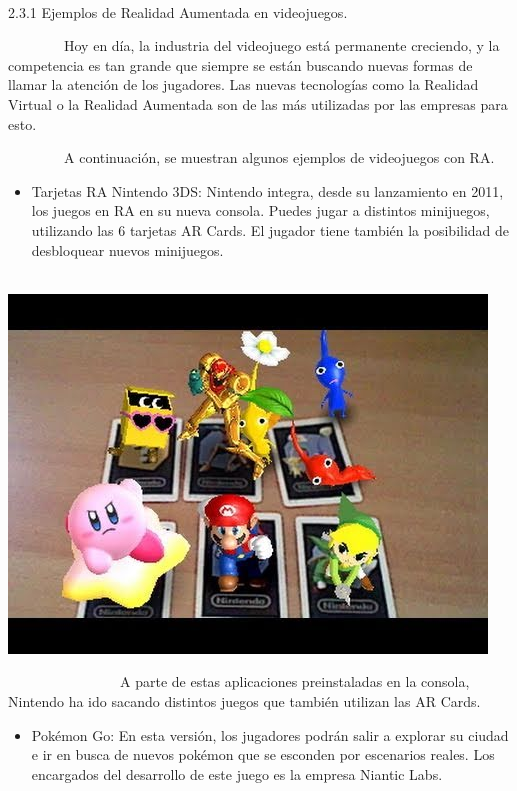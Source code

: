 \documentclass[]{article}
\begin{document}
~~~~~~~~

2.3.1 Ejemplos de Realidad Aumentada en videojuegos.

~~~~~~~~Hoy en día, la industria del videojuego está permanente
creciendo, y la competencia es tan grande que siempre se están buscando
nuevas formas de llamar la atención de los jugadores. Las nuevas
tecnologías como la Realidad Virtual o la Realidad Aumentada son de las
más utilizadas por las empresas para esto.

~~~~~~~~A continuación, se muestran algunos ejemplos de videojuegos con
RA.

\begin{itemize}
\itemsep1pt\parskip0pt
\item
  Tarjetas RA Nintendo 3DS: Nintendo integra, desde su lanzamiento en
  2011, los juegos en RA en su nueva consola. Puedes jugar a distintos
  minijuegos, utilizando las 6 tarjetas AR Cards. El jugador tiene
  también la posibilidad de desbloquear nuevos minijuegos.
\end{itemize}

~~~~~~~~~~~~~~~~\includegraphics{images/image19.jpg}

~~~~~~~~~~~~~~~~A parte de estas aplicaciones preinstaladas en la
consola, Nintendo ha ido sacando distintos juegos que también utilizan
las AR Cards.

\begin{itemize}
\itemsep1pt\parskip0pt
\item
  Pokémon Go: En esta versión, los jugadores podrán salir a explorar su
  ciudad e ir en busca de nuevos pokémon que se esconden por escenarios
  reales. Los encargados del desarrollo de este juego es la empresa
  Niantic Labs.
\end{itemize}
\end{document}
